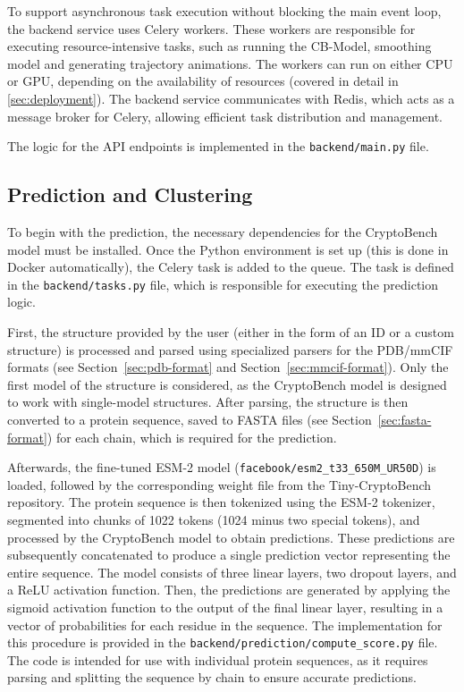 
To support asynchronous task execution without blocking the main event loop, the backend service uses Celery workers. These workers are responsible for executing resource-intensive tasks, such as running the CB-Model, smoothing model and generating trajectory animations. The workers can run on either CPU or GPU, depending on the availability of resources (covered in detail in \ref{sec:deployment}). The backend service communicates with Redis, which acts as a message broker for Celery, allowing efficient task distribution and management.

The logic for the API endpoints is implemented in the \lstinline!backend/main.py! file.

\subsection{Prediction and Clustering}
\label{sec:prediction-backend}

To begin with the prediction, the necessary dependencies for the CryptoBench model must be installed. Once the Python environment is set up (this is done in Docker automatically), the Celery task is added to the queue. The task is defined in the \lstinline!backend/tasks.py! file, which is responsible for executing the prediction logic.

First, the structure provided by the user (either in the form of an ID or a custom structure) is processed and parsed using specialized parsers for the PDB/mmCIF formats (see Section~\ref{sec:pdb-format} and Section~\ref{sec:mmcif-format}). Only the first model of the structure is considered, as the CryptoBench model is designed to work with single-model structures. After parsing, the structure is then converted to a protein sequence, saved to FASTA files (see Section~\ref{sec:fasta-format}) for each chain, which is required for the prediction.

Afterwards, the fine-tuned ESM-2 model (\lstinline!facebook/esm2_t33_650M_UR50D!) is loaded, followed by the corresponding weight file from the Tiny-CryptoBench repository. The protein sequence is then tokenized using the ESM-2 tokenizer, segmented into chunks of 1022 tokens (1024 minus two special tokens), and processed by the CryptoBench model to obtain predictions. These predictions are subsequently concatenated to produce a single prediction vector representing the entire sequence. The model consists of three linear layers, two dropout layers, and a ReLU activation function. Then, the predictions are generated by applying the sigmoid activation function to the output of the final linear layer, resulting in a vector of probabilities for each residue in the sequence. The implementation for this procedure is provided in the \lstinline!backend/prediction/compute_score.py! file. The code is intended for use with individual protein sequences, as it requires parsing and splitting the sequence by chain to ensure accurate predictions.

